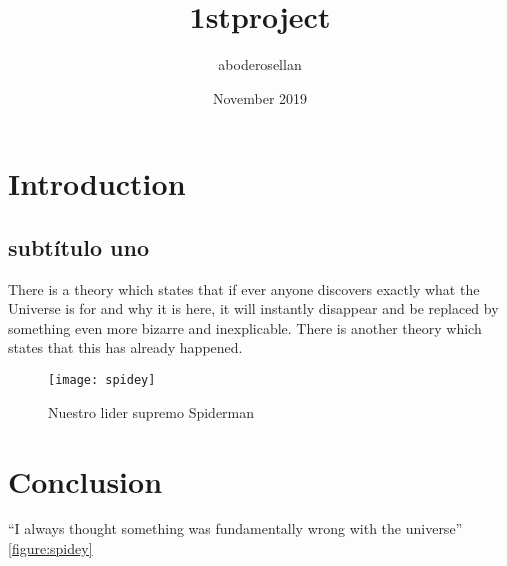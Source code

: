 \documentclass{article}
\title{1stproject}
\author{aboderosellan }
\date{November 2019}
\begin{document}
\maketitle

\section{Introduction}
\subsection{subtítulo uno}
There is a theory which states that if ever anyone discovers exactly what the Universe is for and why it is here, it will instantly disappear and be replaced by something even more bizarre and inexplicable.
There is another theory which states that this has already happened.

\begin{figure}[h!] %
\centering
\texttt{[image: spidey]}
\caption{Nuestro lider supremo Spiderman}
\label{fig:spidey}
\end{figure}

\section{Conclusion}
``I always thought something was fundamentally wrong with the universe'' \ref{figure:spidey} \citep{adams1995hitchhiker}



\end{document}
